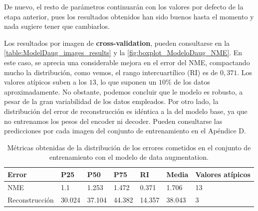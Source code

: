         \medskip

        \noindent De nuevo, el resto de parámetros continuarán con los valores por defecto de la etapa anterior, pues los resultados obtenidos han sido buenos hasta el momento y nada sugiere tener que cambiarlos.

        \medskip

        \noindent Los resultados por imagen de \textbf{cross-validation}, pueden consultarse en la \autoref{table:ModelDaug_images_results} y la \autoref{fig:boxplot_ModeloDaug_NME}. En este caso, se aprecia una considerable mejora en el error del NME, compactando mucho la distribución, como vemos, el rango intercuartílico (RI) es de $0,371$. Los valores atípicos suben a los $13$, lo que suponen un $10\%$ de los datos aproximadamente. No obstante, podemos concluir que le modelo es robusto, a pesar de la gran variabilidad de los datos empleados. Por otro lado, la distribución del error de reconstrucción es idéntica a la del modelo base, ya que no entrenamos los pesos del encoder ni decoder. Pueden consultarse las predicciones por cada imagen del conjunto de entrenamiento en el Apéndice D.

        \begin{table}[!ht]
            \centering
            \caption{Métricas obtenidas de la distribución de los errores cometidos en el conjunto de entrenamiento con el modelo de data augmentation.}
            \begin{tabular}{|l|l|l|l|l|l|l|}
            \hline
            \cellcolor{gray!25}\textbf{Error} & \cellcolor{gray!25}\textbf{P25} & \cellcolor{gray!25}\textbf{P50} & \cellcolor{gray!25}\textbf{P75} & \cellcolor{gray!25}\textbf{RI} & \cellcolor{gray!25}\textbf{Media} & \cellcolor{gray!25}\textbf{Valores atípicos}\\ \hline
                NME & 1.1 & 1.253 & 1.472 & 0.371 & 1.706 & 13 \\ \hline
                Reconstrucción & 30.024 & 37.104 & 44.382 & 14.357 & 38.043 & 3 \\ \hline
            \end{tabular}
            \label{table:ModelDaug_images_results}
        \end{table}

